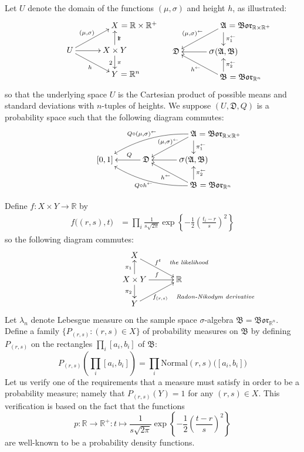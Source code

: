 \documentclass[
twoside=true,
paper=letter,
fontsize=11pt,
pagesize=auto,
leqno,
openany,
headsepline,
overfullrule,
]{scrbook}
\theoremstyle{plain}
\theoremstyle{plain}
\theoremstyle{definition}
\theoremstyle{bfnoteitalic}
\theoremstyle{bfnoteroman}
\newcommand{\sigalg}[1]{\mathfrak{#1}}
\newcommand{\borel}{\mathfrak{Bor}}
\newcommand{\sagb}{\mathop{\hbox{\large{$\sigma$}}}\nolimits}
\newcommand{\textsigma}{\hbox{\large{$\sigma$}}\kern-1pt}
\newcommand{\preimage}[1]{#1^{\leftarrow}}
\newcommand{\R}{\mathbb{R}}
\newcommand{\productsig}[2]{\sagb(#1,#2)}
\newcommand{\function}{f}
\newcommand{\measurespace}{X}
\newcommand{\measurespaceii}{Y}
\newcommand{\measureiii}{\lambda}
\newcommand{\projectionone}{\pi_1}
\newcommand{\projectiontwo}{\pi_2}
\newcommand{\pspace}{\measurespace}%
\newcommand{\sspace}{\measurespaceii}%
\newcommand{\sspacesig}{\sigalg{B}}
\newcommand{\pspacesig}{\sigalg{A}}
\begin{document}
Let $U$ denote the domain of the functions $(\mu,\sigma)$ and height $h$, as illustrated:
\[
\xymatrix@R=16pt@C=30pt{ 
 & \pspace \rlap{ $=\R\times\R^+$}
 \\
 U \ar[ur]^{(\mu,\sigma)} \ar[dr]_h \ar[r] & 
 \pspace\times\sspace \ar[u]_\projectionone \ar[d]^\projectiontwo
 \\
  & \sspace\rlap{ $=\R^n$} \\
}
%
\hspace{50pt}
%
\xymatrix@R=16pt@C=30pt{ 
 & \pspacesig \rlap{ $=\borel_{\R\times\R^+}$}
 \ar[dl]_{\preimage{(\mu,\sigma)}} 
 \ar[d]^{\preimage{\projectionone}}
 \\
 \sigalg{D}  & 
 \productsig{\pspacesig}{\sspacesig} 
 \ar[l]  
 \\
  & \sspacesig \rlap{ $=\borel_{\R^n}$}
  \ar[u]_{\preimage{\projectiontwo}}
  \ar[ul]^{\preimage{h}}
  \\
}
\]
so that the underlying space  $U$ is the Cartesian product of possible means and standard deviations with $n$-tuples of heights.
We suppose $(U,\sigalg{D},Q)$ is a probability space such that the following diagram commutes:
\[
\xymatrix@R=16pt@C=30pt{ 
 & & \pspacesig \rlap{ $=\borel_{\R\times\R^+}$}
 \ar[dl]_{\kern30pt\preimage{(\mu,\sigma)}} 
 \ar[d]^{\preimage{\projectionone}}
 \ar@/_10pt/[lld]_{Q\circ \preimage{(\mu,\sigma)}}
 \\
 [0,1] & \sigalg{D} \ar[l]_-{\ Q} & 
 \productsig{\pspacesig}{\sspacesig} 
 \ar[l]  
 \\
 & & \sspacesig \rlap{ $=\borel_{\R^n}$}
  \ar[u]_{\preimage{\projectiontwo}}
  \ar[ul]^{\preimage{h}}
  \ar@/^10pt/[llu]^{Q\circ\preimage{h}}
  \\
}
\]

Define $\function:\pspace \times \sspace \to\R$ by
\begin{align*}
\function\bigl((r,s),t\bigr)
& =
\prod_i
\frac{1}{s\sqrt{2\pi}}
\exp
\left\{
-\frac{1}{2}
\left(
\frac{t_i-r}{s}
\right)^2
\right\}
\end{align*}
so the following diagram commutes:
\[
\xymatrix@R=16pt@C=30pt{ 
\pspace \ar[dr]^{\function^t\quad \rlap{\emph{\scriptsize the likelihood}}}
& \\
\pspace\times\sspace 
\ar[u]^{\projectionone}
\ar[d]_{\projectiontwo}
\ar[r]^{\function}
& \R \\
\sspace 
\ar[ur]_{\function_{(r,s)} \quad \rlap{\emph{\scriptsize Radon-Nikodym derivative}}} 
& 
}
\]
Let $\measureiii_n$ denote Lebesgue measure on the sample space \textsigma-algebra 
$\sspacesig=\borel_{\R^n}$.
Define a family $\{P_{(r,s)} : (r,s) \in \pspace \}$ of probability measures on $\sspacesig$ by defining
$P_{(r,s)}$ on the
rectangles $\prod_i[a_i,b_i]$ of $\sspacesig$:
\[
P_{(r,s)}\left(\prod_i[a_i,b_i]\right) =
\prod_i\text{Normal}(r,s)\bigl([a_i,b_i]\bigr)
\]
Let us verify one of the requirements that a measure must satisfy in order to be a probability measure; namely that
$P_{(r,s)}(\sspace)=1$ for any $(r,s)\in\pspace$.
This verification is based on the fact that the functions
\[
p:\R\to\R^+
:t \mapsto
\frac{1}{s\sqrt{2\pi}}
\exp
\left\{
-\frac{1}{2}
\left(
\frac{t-r}{s}
\right)^2
\right\}
\]
are well-known to be a probability density functions.
\end{document}
